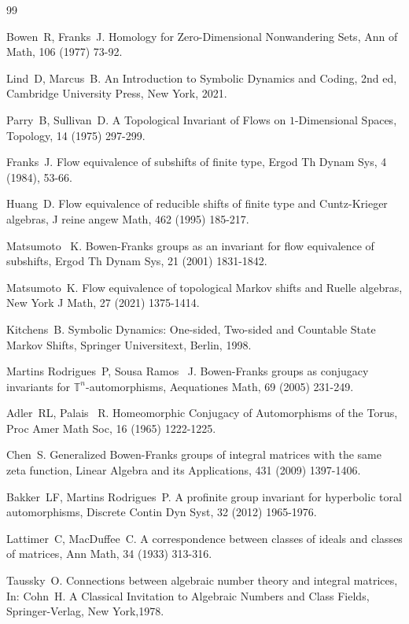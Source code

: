 \documentclass{amsart}
\theoremstyle{plain}
\theoremstyle{definition}
\theoremstyle{remark}
\begin{document}
\begin{thebibliography}{99}

Bowen~R, Franks~J. Homology for Zero-Dimensional Nonwandering Sets, Ann of Math, 106 (1977) 73-92.

Lind~D, Marcus~B. An Introduction to Symbolic Dynamics and Coding, 2nd ed, Cambridge University Press, New York, 2021.

Parry~B, Sullivan~D. A Topological Invariant of Flows on $1$-Dimensional Spaces, Topology, 14 (1975) 297-299.

Franks~J. Flow equivalence of subshifts of finite type, Ergod Th Dynam Sys, 4 (1984), 53-66.

Huang~D. Flow equivalence of reducible shifts of finite type and Cuntz-Krieger algebras, J reine angew Math, 462 (1995) 185-217.

Matsumoto~ K. Bowen-Franks groups as an invariant for flow equivalence of subshifts, Ergod Th Dynam Sys, 21 (2001) 1831-1842.

Matsumoto~K. Flow equivalence of topological Markov shifts and Ruelle algebras, New York J Math, 27 (2021) 1375-1414. 

Kitchens~B. Symbolic Dynamics: One-sided, Two-sided and Countable State Markov Shifts, Springer Universitext, Berlin, 1998.

Martins Rodrigues~P, Sousa Ramos~ J. Bowen-Franks groups as conjugacy invariants for ${\mathbb T}^n$-automorphisms, Aequationes Math, 69 (2005) 231-249.

Adler~RL, Palais~ R. Homeomorphic Conjugacy of Automorphisms of the Torus, Proc Amer Math Soc, 16 (1965) 1222-1225.

Chen~S. Generalized Bowen-Franks groups of integral matrices with the same zeta function, Linear Algebra and its Applications, 431 (2009) 1397-1406.

Bakker~LF, Martins Rodrigues~P. A profinite group invariant for hyperbolic toral automorphisms, Discrete Contin Dyn Syst, 32 (2012) 1965-1976.

Lattimer~C, MacDuffee~C. A correspondence between classes of ideals and classes of matrices, Ann Math, 34 (1933) 313-316.

Taussky~O. Connections between algebraic number theory and integral matrices, In: Cohn~H. A Classical Invitation to Algebraic Numbers and Class Fields, Springer-Verlag, New York,1978.


\end{thebibliography}
\end{document}
